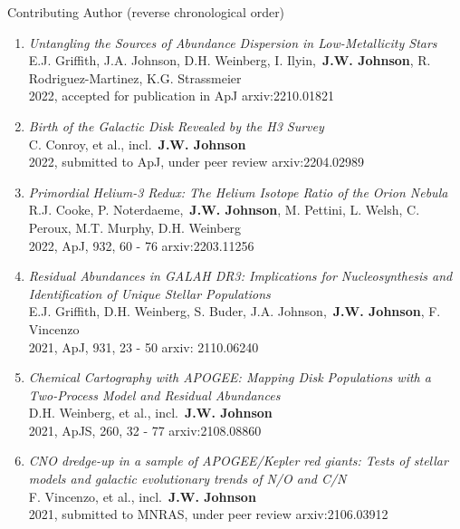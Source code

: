 \documentclass[cv.tex]{subfiles}
\begin{document}
\par\null\par\noindent
{\color{themecolor} \large Contributing Author}
(reverse chronological order)
\par\noindent
\begin{enumerate}

	\vspace{-3mm}

	\item \textit{Untangling the Sources of Abundance Dispersion in
	Low-Metallicity Stars}
	\\
	E.J. Griffith, J.A. Johnson, D.H. Weinberg, I. Ilyin,~\textbf{J.W. Johnson},
	R. Rodriguez-Martinez, K.G. Strassmeier
	\\
	2022, accepted for publication in ApJ \hfill arxiv:2210.01821

	\item \textit{Birth of the Galactic Disk Revealed by the H3 Survey}
	\\
	C. Conroy, et al., incl.~\textbf{J.W. Johnson}
	\\
	2022, submitted to ApJ, under peer review \hfill arxiv:2204.02989

	\item \textit{Primordial Helium-3 Redux: The Helium Isotope Ratio of the
	Orion Nebula}
	\\
	R.J. Cooke, P. Noterdaeme,~\textbf{J.W. Johnson}, M. Pettini, L. Welsh,
	C. Peroux, M.T. Murphy, D.H. Weinberg
	\\
	2022, ApJ, 932, 60 - 76 \hfill arxiv:2203.11256

	\item \textit{Residual Abundances in GALAH DR3: Implications for
	Nucleosynthesis and Identification of Unique Stellar Populations}
	\\
	E.J. Griffith, D.H. Weinberg, S. Buder, J.A. Johnson,~\textbf{J.W. Johnson},
	F. Vincenzo
	\\
	2021, ApJ, 931, 23 - 50 \hfill arxiv: 2110.06240

	\item \textit{Chemical Cartography with APOGEE: Mapping Disk Populations
	with a Two-Process Model and Residual Abundances}
	\\
	D.H. Weinberg, et al., incl.~\textbf{J.W. Johnson}
	\\
	2021, ApJS, 260, 32 - 77 \hfill arxiv:2108.08860

	\item \textit{CNO dredge-up in a sample of APOGEE/Kepler red giants: Tests
	of stellar models and galactic evolutionary trends of N/O and C/N}
	\\
	F. Vincenzo, et al., incl.~\textbf{J.W. Johnson}
	\\
	2021, submitted to MNRAS, under peer review \hfill arxiv:2106.03912


\end{enumerate}
\end{document}
